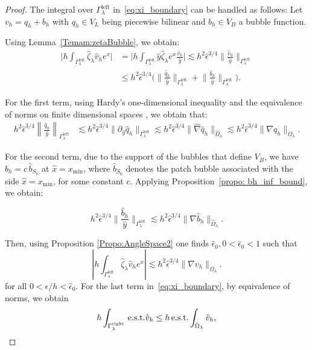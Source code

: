 \documentclass{article}
\newcommand{\est}{\text{\,e.s.t.}\xspace}
\newcommand{\Gammaleft}{\ensuremath{\Gamma_\lambda^{\text{left}}}\xspace}
\newcommand{\Gammaright}{\ensuremath{\Gamma_\lambda^{\text{right}}}\xspace}
\begin{document}
\begin{proof}
The integral over \Gammaleft in~\eqref{eq:xi_boundary}   can be handled as follows:
Let ${v_h = q_h + b_h}$ with $q_h \in V_L$ being piecewise bilinear and $b_h \in V_B$  a bubble function.

Using Lemma~\ref{Temam:zetaBubble}, we obtain:
\begin{equation*}
\begin{aligned}
\Big|h\int_{\Gammaleft} \hat{\zeta}_\lambda \hat{v}_h e^x\Big| &= 
    \Big| h\int_{\Gammaleft} \hat{y} \hat{\zeta}_\lambda e^x \frac{\hat{v}_h}{\hat{y}} \Big|
  \lesssim h^2\hat{\epsilon}^{3/4} \bigg\| \frac{\hat{v}_h}{\hat{y}}\bigg\|_{\Gammaleft} 
  \\
  & \le h^2\hat{\epsilon}^{3/4} \Big(\bigg\| \frac{\hat{q}_h}{\hat{y}}\bigg\|_{\Gammaleft}+ \bigg\| \frac{\hat{b}_h}{\hat{y}}\bigg\|_{\Gammaleft}\Big).
\end{aligned}
\end{equation*}

For the first term, using Hardy's one-dimensional inequality and the equivalence of norms on finite dimensional spaces%
, we obtain that:
\begin{equation*}
 \begin{aligned}
  h^2\hat{\epsilon}^{3/4} \left\| \frac{\hat{q}_h}{\hat{y}}\right\|_{\Gammaleft}
 &\lesssim  h^2\hat{\epsilon}^{3/4} \| \partial_{\hat{y}} \hat{q}_h\|_{\Gammaleft} 
 \lesssim h^2\hat{\epsilon}^{3/4} \| \hat{\nabla} \hat{q}_h\|_{\hat{\Omega}_\lambda}
 \lesssim  h^2\hat{\epsilon}^{3/4} \| \nabla q_h\|_{\Omega_\lambda}.
 \end{aligned}   
\end{equation*}

For the second term, due to the support of the bubbles that define $V_B$, we have $\hat{b}_h = c \, \hat{b}_{S_0}$ at $\hat{x} = x_{\min}$, where $\hat{b}_{S_0}$ denotes the patch bubble associated with the side $\hat{x} = x_{\min}$, for some constant $c$. Applying Proposition~\ref{propo: bh_inf_bound}, we obtain:

\begin{equation*}
      h^2\hat{\epsilon}^{3/4} \bigg\| \frac{\hat{b}_h}{\hat{y}}\bigg\|_{\Gammaleft}
      \lesssim 
      h^2\hat{\epsilon}^{3/4} \| \nabla  \hat{b}_h\|_{\hat{\Omega}_\lambda}.
\end{equation*}

Then, using Proposition \ref{Propo:AngleSpace2} 
one finds $\hat{\epsilon}_0, 0 < \hat{\epsilon}_0 < 1$ such that
\begin{equation}\label{Eq:78}
    |h\int_{\Gammaleft} \hat{\zeta}_\lambda \hat{v}_h e^x| \lesssim
     h^2\hat{\epsilon}^{3/4} \| \nabla v_h\|_{\Omega_\lambda}.
\end{equation}
for all $0<\epsilon/h < \hat{\epsilon}_0$.
For the last term in~\eqref{eq:xi_boundary}, by equivalence of norms, we obtain
\begin{equation}
\label{Eq:80}
    h\int_{\Gammaright} \text{\est } \hat{v}_h
    \leq
    h\est \int_{\hat{\Omega}_{\lambda}}\hat{v}_h,
\end{equation}


\end{proof}
\end{document}
